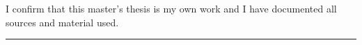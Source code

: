 \thispagestyle{empty}
\vspace*{0.8\textheight}

\noindent
I confirm that this master's thesis is my own work and I have documented all sources and material used.

\vspace{20mm}

\noindent
\submissionDate 	\hfill	\rule{30mm}{0.1mm}\\
\submissionLocation	\hfill	\thesisAuthor

\cleardoublepage{}
